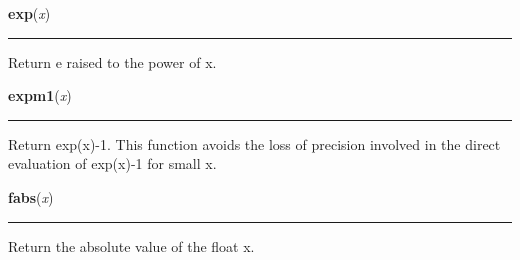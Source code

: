 \hspace{.8\funcindent}\begin{boxedminipage}{\funcwidth}

    \raggedright \textbf{exp}(\textit{x})

    \vspace{-1.5ex}

    \rule{\textwidth}{0.5\fboxrule}
\setlength{\parskip}{2ex}
    Return e raised to the power of x.

\setlength{\parskip}{1ex}
    \end{boxedminipage}

    \label{math:expm1}

    \vspace{0.5ex}

\hspace{.8\funcindent}\begin{boxedminipage}{\funcwidth}

    \raggedright \textbf{expm1}(\textit{x})

    \vspace{-1.5ex}

    \rule{\textwidth}{0.5\fboxrule}
\setlength{\parskip}{2ex}
    Return exp(x)-1. This function avoids the loss of precision involved in
    the direct evaluation of exp(x)-1 for small x.

\setlength{\parskip}{1ex}
    \end{boxedminipage}

    \label{math:fabs}

    \vspace{0.5ex}

\hspace{.8\funcindent}\begin{boxedminipage}{\funcwidth}

    \raggedright \textbf{fabs}(\textit{x})

    \vspace{-1.5ex}

    \rule{\textwidth}{0.5\fboxrule}
\setlength{\parskip}{2ex}
    Return the absolute value of the float x.

\setlength{\parskip}{1ex}
    \end{boxedminipage}

    \label{math:factorial}

    \vspace{0.5ex}

